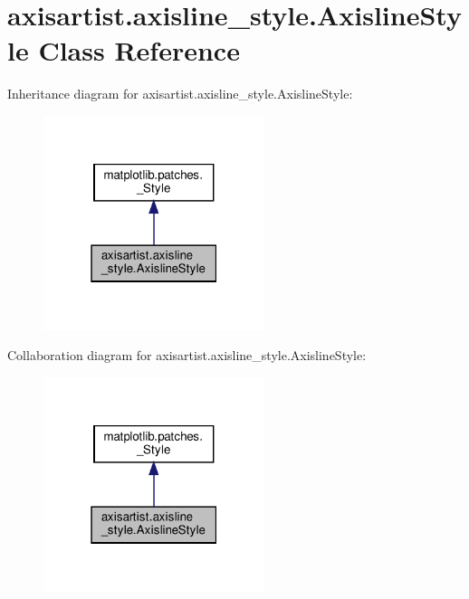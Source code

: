 \hypertarget{classaxisartist_1_1axisline__style_1_1AxislineStyle}{}\section{axisartist.\+axisline\+\_\+style.\+Axisline\+Style Class Reference}
\label{classaxisartist_1_1axisline__style_1_1AxislineStyle}


Inheritance diagram for axisartist.\+axisline\+\_\+style.\+Axisline\+Style\+:
\nopagebreak
\begin{figure}[H]
\begin{center}
\leavevmode
\includegraphics[width=183pt]{classaxisartist_1_1axisline__style_1_1AxislineStyle__inherit__graph}
\end{center}
\end{figure}


Collaboration diagram for axisartist.\+axisline\+\_\+style.\+Axisline\+Style\+:
\nopagebreak
\begin{figure}[H]
\begin{center}
\leavevmode
\includegraphics[width=183pt]{classaxisartist_1_1axisline__style_1_1AxislineStyle__coll__graph}
\end{center}
\end{figure}
